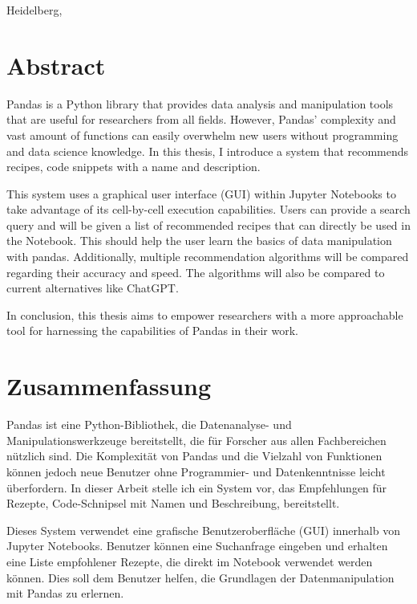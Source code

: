 \documentclass[
     12pt,                    %
     a4paper,             %
     BCOR=10mm,     %
     DIV=14,                 %
     listof=totoc,                    %
     bibliography=totoc,       %
     index=totoc,              %
     twoside,
     headsepline
     ]{scrreprt}
\newcommand{\setlang}[1]{\selectlanguage{#1}\nonfrenchspacing}
\begin{document}
\vspace*{50pt}

\noindent
Heidelberg, 
\cleardoublepage

\setlang{english}
\section*{Abstract}

Pandas is a Python library that provides data analysis and manipulation tools that are useful for researchers from all fields. However, Pandas' complexity and vast amount of functions can easily overwhelm new users without programming and data science knowledge. In this thesis, I introduce a system that recommends recipes, code snippets with a name and description.

This system uses a graphical user interface (GUI) within Jupyter Notebooks to take advantage of its cell-by-cell execution capabilities. Users can provide a search query and will be given a list of recommended recipes that can directly be used in the Notebook. This should help the user learn the basics of data manipulation with pandas. Additionally, multiple recommendation algorithms will be compared regarding their accuracy and speed. The algorithms will also be compared to current alternatives like ChatGPT.

In conclusion, this thesis aims to empower researchers with a more approachable tool for harnessing the capabilities of Pandas in their work.


\clearpage

\setlang{ngerman}
\section*{Zusammenfassung}

Pandas ist eine Python-Bibliothek, die Datenanalyse- und Manipulationswerkzeuge bereitstellt, die für Forscher aus allen Fachbereichen nützlich sind. Die Komplexität von Pandas und die Vielzahl von Funktionen können jedoch neue Benutzer ohne Programmier- und Datenkenntnisse leicht überfordern. In dieser Arbeit stelle ich ein System vor, das Empfehlungen für Rezepte, Code-Schnipsel mit Namen und Beschreibung, bereitstellt.

Dieses System verwendet eine grafische Benutzeroberfläche (GUI) innerhalb von Jupyter Notebooks. Benutzer können eine Suchanfrage eingeben und erhalten eine Liste empfohlener Rezepte, die direkt im Notebook verwendet werden können. Dies soll dem Benutzer helfen, die Grundlagen der Datenmanipulation mit Pandas zu erlernen.
\end{document}
